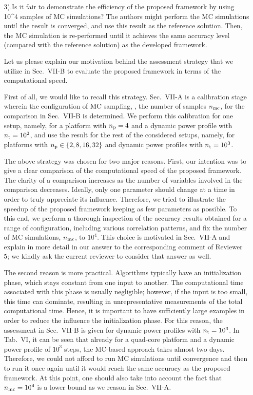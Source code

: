 \begin{reviewer}
3).Is it fair to demonstrate the efficiency of the proposed framework by using 10\^{}4 samples of MC simulations? The authors might perform the MC simulations until the result is converged, and use this result as the reference solution. Then, the MC simulation is re-performed until it achieves the same accuracy level (compared with the reference solution) as the developed framework.
\end{reviewer}
\begin{authors}
Let us please explain our motivation behind the assessment strategy that we utilize in Sec.~VII-B to evaluate the proposed framework in terms of the computational speed.

First of all, we would like to recall this strategy.
Sec.~VII-A is a calibration stage wherein the configuration of MC sampling, \ie, the number of samples ${n_\text{mc}}$, for the comparison in Sec.~VII-B is determined.
We perform this calibration for one setup, namely, for a platform with ${n_\text{p}} = 4$ and a dynamic power profile with ${n_\text{t}} = 10^2$, and use the result for the rest of the considered setups, namely, for platforms with ${n_\text{p}} \in \{ 2, 8, 16, 32 \}$ and dynamic power profiles with ${n_\text{t}} = 10^3$.

The above strategy was chosen for two major reasons.
First, our intention was to give a clear comparison of the computational speed of the proposed framework.
The clarity of a comparison increases as the number of variables involved in the comparison decreases.
Ideally, only one parameter should change at a time in order to truly appreciate its influence.
Therefore, we tried to illustrate the speedup of the proposed framework keeping as few parameters as possible.
To this end, we perform a thorough inspection of the accuracy results obtained for a range of configuration, including various correlation patterns, and fix the number of MC simulations, ${n_\text{mc}}$, to $10^4$.
This choice is motivated in Sec.~VII-A and explain in more detail in our answer to the corresponding comment of Reviewer 5; we kindly ask the current reviewer to consider that answer as well.

The second reason is more practical.
Algorithms typically have an initialization phase, which stays constant from one input to another.
The computational time associated with this phase is usually negligible; however, if the input is too small, this time can dominate, resulting in unrepresentative measurements of the total computational time.
Hence, it is important to have sufficiently large examples in order to reduce the influence the initialization phase.
For this reason, the assessment in Sec.~VII-B is given for dynamic power profiles with ${n_\text{t}} = 10^3$.
In Tab.~VI, it can be seen that already for a quad-core platform and a dynamic power profile of $10^3$ steps, the MC-based approach takes almost two days.
Therefore, we could not afford to run MC simulations until convergence and then to run it once again until it would reach the same accuracy as the proposed framework.
At this point, one should also take into account the fact that ${n_\text{mc}} = 10^4$ is a lower bound as we reason in Sec.~VII-A.


\end{authors}
